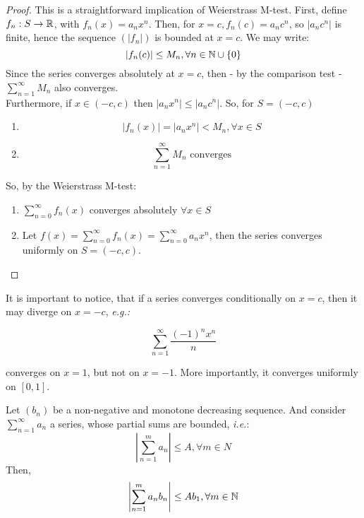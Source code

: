 \begin{proof}
    This is a straightforward implication of Weierstrass M-test. First, define $f_n: S \to \mathbb{R}$, with $f_n(x) = a_n x^n$. Then, for $x = c, f_n(c) = a_n c^n$, so $|a_n c^n|$ is finite, hence the sequence $(|f_n|)$ is bounded at $x = c$. We may write:
    \begin{equation*}
        |f_n(c)| \leq M_n, \forall n \in \mathbb{N} \cup \{0\}
    \end{equation*}
    Since the series converges absolutely at $x = c$, then - by the comparison test - $\sum_{n=1}^\infty M_n$ also converges. \\
    Furthermore, if $x \in (-c, c)$ then $|a_n x^n| \leq |a_n c^n|$. So, for $S = (-c, c)$
    \begin{enumerate}
        \item 
            \begin{equation*}
                |f_n(x)| = |a_n x^n| < M_n, \forall x \in S
            \end{equation*}
        \item 
            \begin{equation*}
                \sum \limits_{n = 1}^\infty M_n \text{ converges}
            \end{equation*}            
    \end{enumerate}
    So, by the Weierstrass M-test:
    \begin{enumerate}
        \item $\sum_{n=0}^\infty f_n(x)$ converges absolutely $\forall x \in S$
        \item Let $f(x) = \sum_{n=0}^\infty f_n(x) = \sum_{n=0}^\infty a_n x^n$, then the series converges uniformly on $S = (-c, c)$.
    \end{enumerate}
\end{proof}

It is important to notice, that if a series converges conditionally on $x = c$, then it may diverge on $x = -c$, \emph{e.g.:}

\begin{equation*}
    \sum \limits_{n=1}^\infty \frac{(-1)^n x^n}{n}
\end{equation*}

converges on $x = 1$, but not on $x = -1$. More importantly, it converges uniformly on $[0,1]$. 

\begin{lemma}
    Let $(b_n)$ be a non-negative and monotone decreasing sequence. And consider $\sum_{n=1}^\infty a_n$ a series, whose partial sums are bounded, \emph{i.e.}:
    \begin{equation*}
        \left |
            \sum \limits_{n=1}^m a_n
        \right |
        \leq A, \forall m \in N
    \end{equation*}
    Then, 
    \begin{equation*}
        \left |
            \sum \limits_{n=1}^m a_n b_n
        \right |
        \leq A b_1, \forall m \in \mathbb{N}
    \end{equation*}
\end{lemma}


